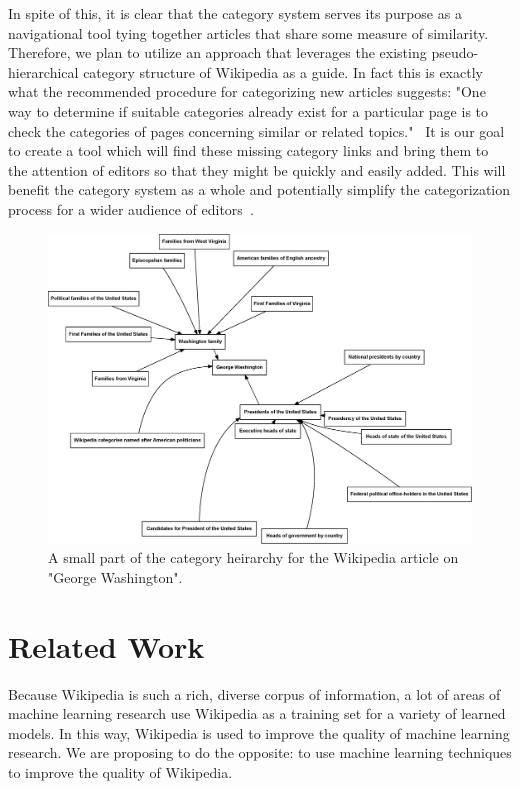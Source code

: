 \documentclass{sig-alternate}
\begin{document}
In spite of this, it is clear that the category system serves its purpose as a navigational tool tying together articles that share some measure of similarity. Therefore, we plan to utilize an approach that leverages the existing pseudo-hierarchical category structure of Wikipedia as a guide. In fact this is exactly what the recommended procedure for categorizing new articles suggests: "One way to determine if suitable categories already exist for a particular page is to check the categories of pages concerning similar or related topics."~\cite{cattalk} It is our goal to create a tool which will find these missing category links and bring them to the attention of editors so that they might be quickly and easily added. This will benefit the category system as a whole and potentially simplify the categorization process for a wider audience of editors~\cite{Fu}.
\begin{figure}[htb!]
	\begin{center}
		\includegraphics[width=1.0\linewidth]{washington-graph}
	\end{center}
	\vspace{-12pt}
	\caption{A small part of the category heirarchy for the Wikipedia article on "George Washington".}
	\label{fig:washington-graph}
\end{figure}


\section{Related Work}
\label{sec:related_work}
Because Wikipedia is such a rich, diverse corpus of information, a lot of areas of machine learning research use Wikipedia as a training set for a variety of learned models. In this way, Wikipedia is used to improve the quality of machine learning research. We are proposing to do the opposite: to use machine learning techniques to improve the quality of Wikipedia.
\end{document}
